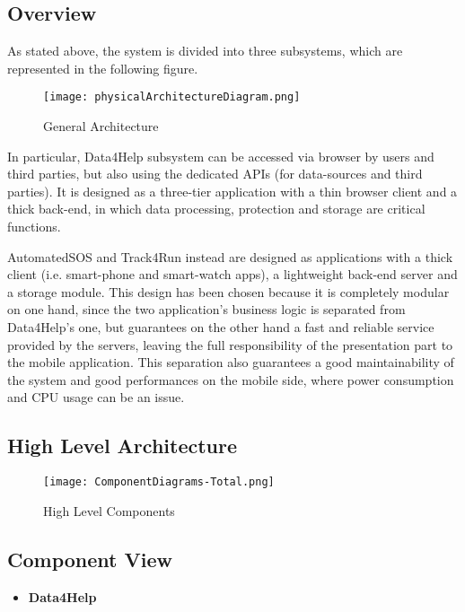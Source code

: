 \subsection{Overview}
As stated above, the system is divided into three subsystems, which are represented in the following figure.

\FloatBarrier

\begin{figure}[!h]
	\centering
	\texttt{[image: physicalArchitectureDiagram.png]}
	\caption{General Architecture}
\end{figure}


\FloatBarrier

In particular, Data4Help subsystem can be accessed via browser by users and third parties, but also using the dedicated APIs (for data-sources and third parties). It is designed as a three-tier application with a thin browser client and a thick back-end, in which data processing, protection and storage are critical functions.

AutomatedSOS and Track4Run instead are designed as applications with a thick client (i.e. smart-phone and smart-watch apps), a lightweight back-end server and a storage module. This design has been chosen because it is completely modular on one hand, since the two application's business logic is separated from Data4Help's one, but guarantees on the other hand a fast and reliable service provided by the servers, leaving the full responsibility of the presentation part to the mobile application. This separation also guarantees a good maintainability of the system and good performances on the mobile side, where power consumption and CPU usage can be an issue.

\subsection{High Level Architecture}

\FloatBarrier
\begin{figure}[!h]
	\centering
	\texttt{[image: ComponentDiagrams-Total.png]}
	\caption{High Level Components}
\end{figure}

\FloatBarrier


\subsection{Component View}


\begin{itemize}
	\item \textbf{Data4Help}
\end{itemize}

